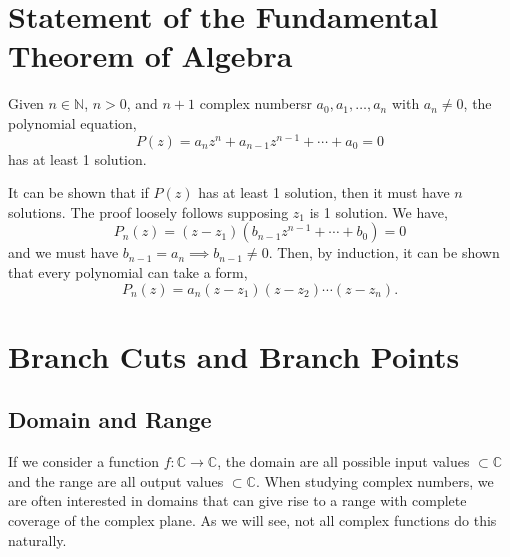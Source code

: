 \documentclass{book}
\begin{document}
\section{Statement of the Fundamental Theorem of Algebra}
\begin{Theorems}{}{}
	Given $n \in \mathbb{N}$, $n > 0$, and $n+1$ complex numbersr $a_0, a_1, \ldots, a_n$ with $a_n \neq 0$, the polynomial equation,
	\begin{equation}
		P(z) = a_nz^n + a_{n-1}z^{n-1} + \cdots + a_0 = 0
	\end{equation}
	has at least 1 solution.
\end{Theorems}
It can be shown that if $P(z)$ has at least 1 solution, then it must have $n$ solutions. The proof loosely follows supposing $z_1$ is 1 solution. We have,
\begin{equation}
	P_n(z) = (z-z_1)(b_{n-1}z^{n-1} + \cdots + b_0) = 0
\end{equation}
and we must have $b_{n-1} = a_n \implies b_{n-1} \neq 0$. Then, by induction, it can be shown that every polynomial can take a form,
\begin{equation}
	P_n(z) = a_n(z - z_1)(z-z_2)\cdots(z - z_n).
\end{equation}
\section{Branch Cuts and Branch Points}
\subsection{Domain and Range}
If we consider a function $f : \mathbb{C} \to \mathbb{C}$, the domain are all possible input values $\subset \mathbb{C}$ and the range are all output values $\subset \mathbb{C}$. When studying complex numbers, we are often interested in domains that can give rise to a range with complete coverage of the complex plane. As we will see, not all complex functions do this naturally.
\end{document}
